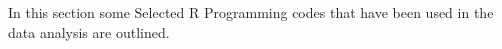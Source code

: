 In this section some Selected R Programming codes that have been used in the data analysis are outlined. \\

